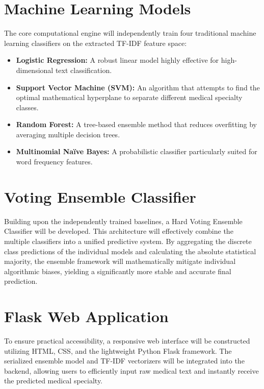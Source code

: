 \section{Machine Learning Models}
The core computational engine will independently train four traditional machine learning classifiers on the extracted TF-IDF feature space:
\begin{itemize}
    \item \textbf{Logistic Regression:} A robust linear model highly effective for high-dimensional text classification.
    \item \textbf{Support Vector Machine (SVM):} An algorithm that attempts to find the optimal mathematical hyperplane to separate different medical specialty classes.
    \item \textbf{Random Forest:} A tree-based ensemble method that reduces overfitting by averaging multiple decision trees.
    \item \textbf{Multinomial Naïve Bayes:} A probabilistic classifier particularly suited for word frequency features.
\end{itemize}

\section{Voting Ensemble Classifier}
Building upon the independently trained baselines, a Hard Voting Ensemble Classifier will be developed. This architecture will effectively combine the multiple classifiers into a unified predictive system. By aggregating the discrete class predictions of the individual models and calculating the absolute statistical majority, the ensemble framework will mathematically mitigate individual algorithmic biases, yielding a significantly more stable and accurate final prediction.

\section{Flask Web Application}
To ensure practical accessibility, a responsive web interface will be constructed utilizing HTML, CSS, and the lightweight Python Flask framework. The serialized ensemble model and TF-IDF vectorizers will be integrated into the backend, allowing users to efficiently input raw medical text and instantly receive the predicted medical specialty.

